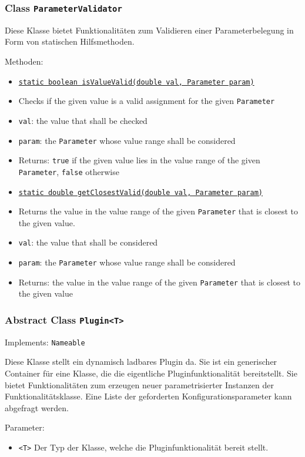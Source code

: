 \documentclass[parskip=full,11pt]{scrartcl}
\begin{document}
\subsubsection{Class \texttt{ParameterValidator}}

Diese Klasse bietet Funktionalitäten zum Validieren einer Parameterbelegung in Form von statischen Hilfsmethoden.

Methoden:

\begin{itemize} \itemsep -10pt
	\item \underline{\texttt{static boolean isValueValid(double val, Parameter param)}}
	\item[] Checks if the given value is a valid assignment for the given \texttt{Parameter}
	\item[] \texttt{val}: the value that shall be checked
	\item[] \texttt{param}: the \texttt{Parameter} whose value range shall be considered
	\item[] Returns: \texttt{true} if the given value lies in the value range of the given \texttt{Parameter}, \texttt{false} otherwise
	\item \underline{\texttt{static double getClosestValid(double val, Parameter param)}}
	\item[] Returns the value in the value range of the given \texttt{Parameter} that is closest to the given value.
	\item[] \texttt{val}: the value that shall be considered
	\item[] \texttt{param}: the \texttt{Parameter} whose value range shall be considered
	\item[] Returns: the value in the value range of the given \texttt{Parameter} that is closest to the given value
\end{itemize}

\subsubsection{Abstract Class \texttt{Plugin<T>}}
Implements: \texttt{Nameable}


Diese Klasse stellt ein dynamisch ladbares Plugin da. Sie ist ein generischer Container für eine Klasse, die die eigentliche Pluginfunktionalität bereitstellt. Sie bietet Funktionalitäten zum erzeugen neuer parametrisierter Instanzen der Funktionalitätsklasse. Eine Liste der geforderten Konfigurationsparameter kann abgefragt werden.

Parameter:
\begin{itemize}\itemsep -10pt
	\item \texttt{<T>} Der Typ der Klasse, welche die Pluginfunktionalität bereit stellt. 
\end{itemize}
\end{document}
